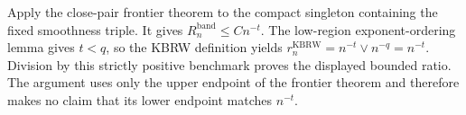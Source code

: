 Apply the close-pair frontier theorem to the compact singleton containing the
fixed smoothness triple.  It gives
\(R_n^{\mathrm{band}}\leq Cn^{-t}\).  The low-region exponent-ordering
lemma gives \(t<q\), so the KBRW definition yields
\(r_n^{\mathrm{KBRW}}=n^{-t}\vee n^{-q}=n^{-t}\).  Division by this
strictly positive benchmark proves the displayed bounded ratio.  The argument
uses only the upper endpoint of the frontier theorem and therefore makes no
claim that its lower endpoint matches \(n^{-t}\).